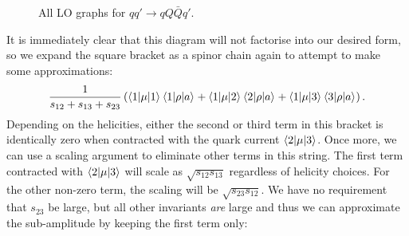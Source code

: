 \begin{figure}[t]
\caption{All LO graphs for $qq' \to qQ\bar{Q}q'$.}
\label{fig:qq_qQQq_graphs}
\end{figure}
It is immediately clear that this diagram will not factorise into our desired form, so we expand the square bracket as a spinor chain again to attempt to make some approximations:
\begin{equation}
\frac{1}{s_{12} + s_{13} + s_{23}} \left(\mathinner{\langle1\vert\mu\vert1\rangle}_{}\mathinner{\langle1\vert\rho\vert a\rangle}_{} + \mathinner{\langle1\vert\mu\vert2\rangle}_{} \mathinner{\langle2\vert\rho\vert a\rangle}_{} + \mathinner{\langle1\vert\mu\vert3\rangle}_{} \mathinner{\langle3\vert\rho\vert a\rangle}_{} \right).
\end{equation}
Depending on the helicities, either the second or third term in this bracket is identically zero when contracted with the quark current $\mathinner{\langle2\vert\mu\vert3\rangle}_{}$. Once more, we can use a scaling argument to eliminate other terms in this string. The first term contracted with $\mathinner{\langle2\vert\mu\vert3\rangle}_{}$ will scale as $\sqrt{s_{12} s_{13}}$ regardless of helicity choices. For the other non-zero term, the scaling will be $\sqrt{s_{23} s_{12}}$. We have no requirement that $s_{23}$ be large, but all other invariants \emph{are} large and thus we can approximate the sub-amplitude by keeping the first term only: 
